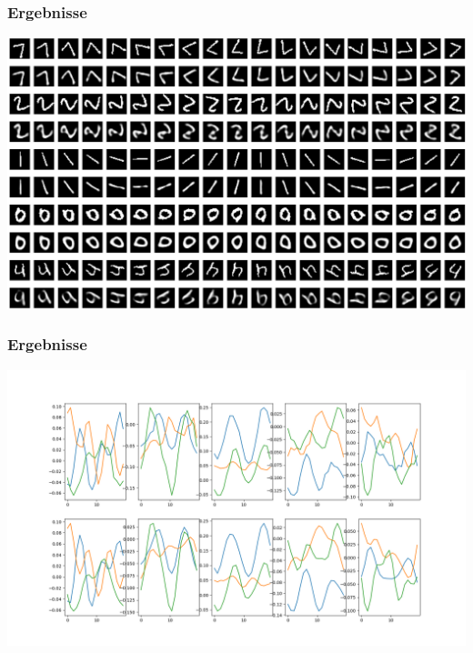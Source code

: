 \begin{frame}
	\frametitle{Ergebnisse}
	\includegraphics[scale=0.4]{Bilder/SDE_rotMNIST_rec}
\end{frame}

\begin{frame}
	\frametitle{Ergebnisse}
	\includegraphics[scale=0.3]{Bilder/SDE_rotMNIST_latent_three_rec}
\end{frame}














